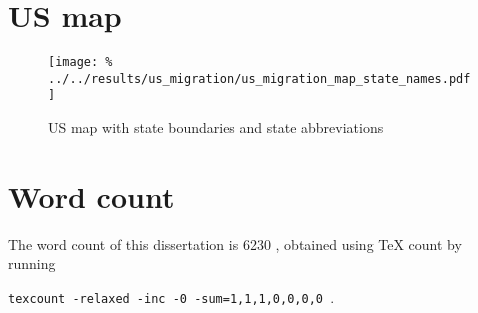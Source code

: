 \documentclass[12pt]{ociamthesis}
\theoremstyle{plain}
\theoremstyle{definition}
\theoremstyle{remark}
\begin{document}
\section{US map} \label{sec:notes_us_map}
%
\vspace*{-0.8cm}
\begin{figure}[H]
  \centering
  \texttt{[image: \%
  ../../results/us\_migration/us\_migration\_map\_state\_names.pdf]}
  \vspace*{-0.5cm} \caption{US map with state boundaries and state
  abbreviations} \label{fig:notes_us_map}
\end{figure}

\section{Word count}

The word count of this dissertation is 6230
\unskip, obtained
using \TeX \hspace*{-0.15cm} count by running
%
\begin{center}
  \texttt{texcount -relaxed -inc -0 -sum=1,1,1,0,0,0,0\,}.
\end{center}
%

\clearpage{}

\pagestyle{empty}
\cleardoublepage
{}
{}
\renewcommand{\bibname}{References}
\pagestyle{fancy}



\end{document}
